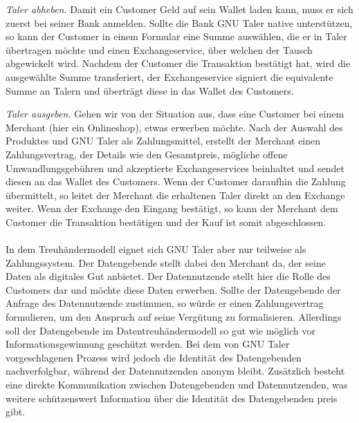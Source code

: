 \documentclass[11pt,a4paper]{scrreprt}
\begin{document}
\textit{Taler abheben.} Damit ein Customer Geld auf sein Wallet laden kann, muss er sich zuerst bei seiner Bank anmelden. Sollte die Bank GNU Taler native unterstützen, so kann der Customer in einem Formular eine Summe auswählen, die er in Taler übertragen möchte und einen Exchangeservice, über welchen der Tausch abgewickelt wird. Nachdem der Customer die Transaktion bestätigt hat, wird die ausgewählte Summe transferiert, der Exchangeservice signiert die equivalente Summe an Talern und überträgt diese in das Wallet des Customers.

\textit{Taler ausgeben.} Gehen wir von der Situation aus, dass eine Customer bei einem Merchant (hier ein Onlineshop), etwas erwerben möchte. Nach der Auswahl des Produktes und GNU Taler als Zahlungsmittel, erstellt der Merchant einen Zahlungsvertrag, der Details wie den Gesamtpreis, mögliche offene Umwandlungsgebühren und akzeptierte Exchangeservices beinhaltet und sendet diesen an das Wallet des Customers.  Wenn der Customer daraufhin die Zahlung übermittelt, so leitet der Merchant die erhaltenen Taler direkt an den Exchange weiter. Wenn der Exchange den Eingang bestätigt, so kann der Merchant dem Customer die Transaktion bestätigen und der Kauf ist somit abgeschlossen. 
\\\\
In dem Treuhändermodell eignet sich GNU Taler aber nur teilweise als Zahlungssystem. Der Datengebende stellt dabei den Merchant da, der seine Daten als digitales Gut anbietet. Der Datennutzende stellt hier die Rolle des Customers dar und möchte diese Daten erwerben. Sollte der Datengebende der Anfrage des Datennutzende zustimmen, so würde er einen Zahlungsvertrag formulieren, um den Anspruch auf seine Vergütung zu formalisieren. Allerdings soll der Datengebende im Datentreuhändermodell so gut wie möglich vor Informationsgewinnung geschützt werden. Bei dem von GNU Taler vorgeschlagenen Prozess wird jedoch die Identität des Datengebenden nachverfolgbar, während der Datennutzenden anonym bleibt. Zusätzlich besteht eine direkte Kommunikation zwischen Datengebenden und Datennutzenden, was weitere schützenswert Information über die Identität des Datengebenden preis gibt.
\end{document}
